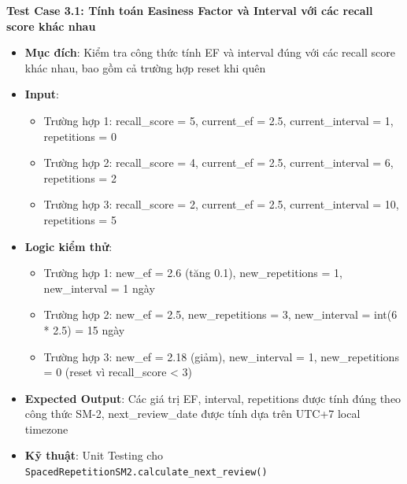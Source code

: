 \documentclass[../DoAn.tex]{subfiles}
\begin{document}
\textbf{Test Case 3.1: Tính toán Easiness Factor và Interval với các recall score khác nhau}
\begin{itemize}
    \item \textbf{Mục đích}: Kiểm tra công thức tính EF và interval đúng với các recall score khác nhau, bao gồm cả trường hợp reset khi quên
    \item \textbf{Input}: 
    \begin{itemize}
        \item Trường hợp 1: recall\_score = 5, current\_ef = 2.5, current\_interval = 1, repetitions = 0
        \item Trường hợp 2: recall\_score = 4, current\_ef = 2.5, current\_interval = 6, repetitions = 2
        \item Trường hợp 3: recall\_score = 2, current\_ef = 2.5, current\_interval = 10, repetitions = 5
    \end{itemize}
    \item \textbf{Logic kiểm thử}: 
    \begin{itemize}
        \item Trường hợp 1: new\_ef = 2.6 (tăng 0.1), new\_repetitions = 1, new\_interval = 1 ngày
        \item Trường hợp 2: new\_ef = 2.5, new\_repetitions = 3, new\_interval = int(6 * 2.5) = 15 ngày
        \item Trường hợp 3: new\_ef = 2.18 (giảm), new\_interval = 1, new\_repetitions = 0 (reset vì recall\_score < 3)
    \end{itemize}
    \item \textbf{Expected Output}: Các giá trị EF, interval, repetitions được tính đúng theo công thức SM-2, next\_review\_date được tính dựa trên UTC+7 local timezone
    \item \textbf{Kỹ thuật}: Unit Testing cho \texttt{SpacedRepetitionSM2.calculate\_next\_review()}
\end{itemize}
\end{document}
